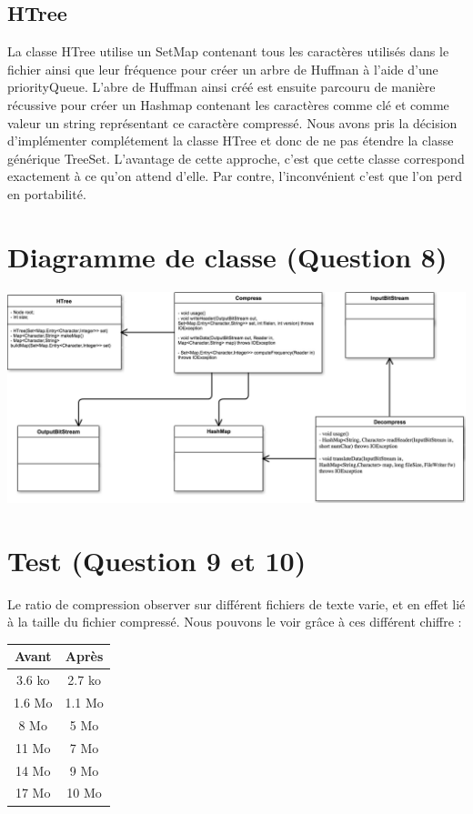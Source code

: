 \documentclass[10pt,a4paper]{article}
\begin{document}
\subsection*{HTree}
La classe HTree utilise un SetMap contenant tous les caractères utilisés dans le fichier ainsi que leur fréquence pour créer un arbre de Huffman à l'aide d'une priorityQueue. L'abre de Huffman ainsi créé est ensuite parcouru de manière récussive pour créer un Hashmap contenant les caractères comme clé et comme valeur un string représentant ce caractère compressé.
Nous avons pris la décision d'implémenter complétement la classe HTree et donc de ne pas étendre la classe générique TreeSet. L'avantage de cette approche, c'est que cette classe correspond exactement à ce qu'on attend d'elle. Par contre, l'inconvénient c'est que l'on perd en portabilité.


\section*{Diagramme de classe (Question 8)}
\begin{center}
    \includegraphics[scale=0.4]{UML.png}
\end{center}

\section*{Test (Question 9 et 10)}

Le ratio de compression observer sur différent fichiers de texte varie, et en effet lié à la taille du fichier compressé. Nous pouvons le voir grâce à ces différent chiffre :
\begin{center}

\begin{tabular}{|c|c|}
  \hline
  Avant & Après \\
  \hline
  3.6 ko & 2.7 ko \\
  1.6 Mo & 1.1 Mo \\
  8 Mo & 5 Mo \\
  11 Mo & 7 Mo \\
  14 Mo & 9 Mo \\
  17 Mo & 10 Mo \\
  \hline
\end{tabular}
\end{center}
\end{document}
